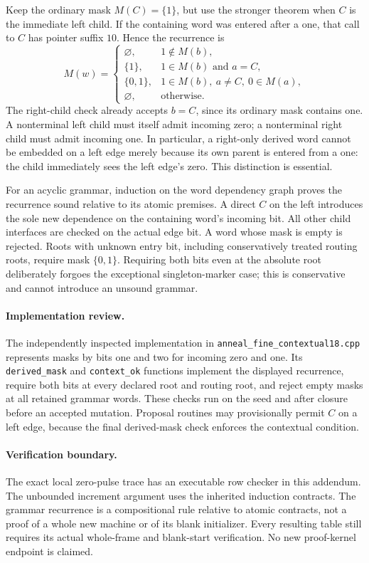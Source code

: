 Keep the ordinary mask $M(C)=\{1\}$, but use the stronger theorem when $C$
is the immediate left child. If the containing word was entered after a
one, that call to $C$ has pointer suffix $10$. Hence the recurrence is
\[
M(w)=
\begin{cases}
\varnothing,&1\notin M(b),\\
\{1\},&1\in M(b)\text{ and }a=C,\\
\{0,1\},&1\in M(b),\ a\ne C,\ 0\in M(a),\\
\varnothing,&\text{otherwise}.
\end{cases}
\]
The right-child check already accepts $b=C$, since its ordinary mask
contains one. A nonterminal left child must itself admit incoming zero;
a nonterminal right child must admit incoming one. In particular, a
right-only derived word cannot be embedded on a left edge merely because
its own parent is entered from a one: the child immediately sees the left
edge's zero. This distinction is essential.

For an acyclic grammar, induction on the word dependency graph proves
the recurrence sound relative to its atomic premises. A direct $C$ on the
left introduces the sole new dependence on the containing word's incoming
bit. All other child interfaces are checked on the actual edge bit. A word
whose mask is empty is rejected. Roots with unknown entry bit, including
conservatively treated routing roots, require mask $\{0,1\}$. Requiring
both bits even at the absolute root deliberately forgoes the exceptional
singleton-marker case; this is conservative and cannot introduce an
unsound grammar.

\paragraph{Implementation review.}
The independently inspected implementation in
\nolinkurl{anneal_fine_contextual18.cpp} represents masks by bits one and two
for incoming zero and one. Its \texttt{derived\_mask} and
\texttt{context\_ok} functions implement the displayed recurrence, require
both bits at every declared root and routing root, and reject empty masks
at all retained grammar words. These checks run on the seed and after
closure before an accepted mutation. Proposal routines may provisionally
permit $C$ on a left edge, because the final derived-mask check enforces
the contextual condition.

\paragraph{Verification boundary.}
The exact local zero-pulse trace has an executable row checker in this
addendum. The unbounded increment argument uses the inherited induction
contracts. The grammar recurrence is a compositional rule relative to
atomic contracts, not a proof of a whole new machine or of its blank
initializer. Every resulting table still requires its actual whole-frame
and blank-start verification. No new proof-kernel endpoint is claimed.
